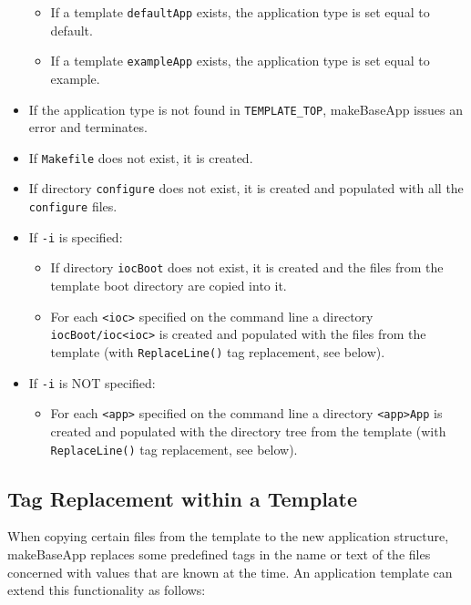 \begin{itemize}
\begin{itemize}
\item If a template \verb|defaultApp| exists, the application type is set equal to default.

\item If a template \verb|exampleApp| exists, the application type is set equal to example.
\end{itemize}

\item If the application type is not found in \verb|TEMPLATE_TOP|, makeBaseApp issues an error and terminates.

\item If \verb|Makefile| does not exist, it is created.

\item If directory \verb|configure| does not exist, it is created and populated with all the \verb|configure| files.

\item If \verb|-i| is specified:

\begin{itemize}
\item If directory \verb|iocBoot| does not exist, it is created and the files from the template boot directory are copied 
into it.

\item For each \verb|<ioc>| specified on the command line a directory \verb|iocBoot/ioc<ioc>| is created and populated with the files from the template (with \verb|ReplaceLine()| tag replacement, see below).
\end{itemize}

\item If \verb|-i| is NOT specified:

\begin{itemize}
\item For each \verb|<app>| specified on the command line a directory \verb|<app>App| is created and populated with the directory tree from the template (with \verb|ReplaceLine()| tag replacement, see below).
\end{itemize}
\end{itemize}

\subsection{Tag Replacement within a Template}

When copying certain files from the template to the new application structure, makeBaseApp replaces some predefined tags in the name or text of the files concerned with values that are known at the time.
An application template can extend this functionality as follows:

